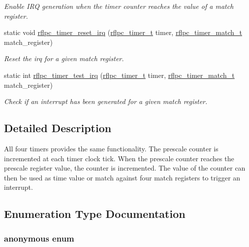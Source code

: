 \begin{DoxyCompactItemize}
\begin{DoxyCompactList}\small\item\em Enable I\-R\-Q generation when the timer counter reaches the value of a match register. \end{DoxyCompactList}\item 
static void \hyperlink{group__timer_gac055674a123185990c8a077614f6d0a2}{rflpc\-\_\-timer\-\_\-reset\-\_\-irq} (\hyperlink{group__timer_gac08825cb88d61086e74638b859cb8b34}{rflpc\-\_\-timer\-\_\-t} timer, \hyperlink{group__timer_ga6be569cd5e74a2e35678ee2de31e853a}{rflpc\-\_\-timer\-\_\-match\-\_\-t} match\-\_\-register)
\begin{DoxyCompactList}\small\item\em Reset the irq for a given match register. \end{DoxyCompactList}\item 
static int \hyperlink{group__timer_ga11cc001f59b165b2ca7b456f317dfece}{rflpc\-\_\-timer\-\_\-test\-\_\-irq} (\hyperlink{group__timer_gac08825cb88d61086e74638b859cb8b34}{rflpc\-\_\-timer\-\_\-t} timer, \hyperlink{group__timer_ga6be569cd5e74a2e35678ee2de31e853a}{rflpc\-\_\-timer\-\_\-match\-\_\-t} match\-\_\-register)
\begin{DoxyCompactList}\small\item\em Check if an interrupt has been generated for a given match register. \end{DoxyCompactList}\end{DoxyCompactItemize}


\subsection{Detailed Description}
All four timers provides the same functionality. The prescale counter is incremented at each timer clock tick. When the prescale counter reaches the prescale register value, the counter is incremented. The value of the counter can then be used as time value or match against four match registers to trigger an interrupt. 

\subsection{Enumeration Type Documentation}
\hypertarget{group__timer_ga06fc87d81c62e9abb8790b6e5713c55b}{\subsubsection[{anonymous enum}]{\setlength{\rightskip}{0pt plus 5cm}anonymous enum}}\label{group__timer_ga06fc87d81c62e9abb8790b6e5713c55b}



